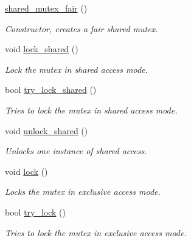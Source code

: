 \begin{DoxyCompactItemize}
\item 
\mbox{\label{classcpen333_1_1thread_1_1impl_1_1shared__mutex__fair_ae8ee9148ad58ad56c12b1cbf49cf9a4f}} 
\hyperlink{classcpen333_1_1thread_1_1impl_1_1shared__mutex__fair_ae8ee9148ad58ad56c12b1cbf49cf9a4f}{shared\+\_\+mutex\+\_\+fair} ()
\begin{DoxyCompactList}\small\item\em Constructor, creates a fair shared mutex. \end{DoxyCompactList}\item 
void \hyperlink{classcpen333_1_1thread_1_1impl_1_1shared__mutex__fair_a0d068ab1af09891a55ac4e066afaf6db}{lock\+\_\+shared} ()
\begin{DoxyCompactList}\small\item\em Lock the mutex in shared access mode. \end{DoxyCompactList}\item 
bool \hyperlink{classcpen333_1_1thread_1_1impl_1_1shared__mutex__fair_aaa17074a3c560ebd8c94a9cee09a1c3f}{try\+\_\+lock\+\_\+shared} ()
\begin{DoxyCompactList}\small\item\em Tries to lock the mutex in shared access mode. \end{DoxyCompactList}\item 
void \hyperlink{classcpen333_1_1thread_1_1impl_1_1shared__mutex__fair_a9a726de789646d73abf5fb03f7627a0b}{unlock\+\_\+shared} ()
\begin{DoxyCompactList}\small\item\em Unlocks one instance of shared access. \end{DoxyCompactList}\item 
void \hyperlink{classcpen333_1_1thread_1_1impl_1_1shared__mutex__fair_a2a75b9f3ae8336d2181cb098d2dcdf3e}{lock} ()
\begin{DoxyCompactList}\small\item\em Locks the mutex in exclusive access mode. \end{DoxyCompactList}\item 
bool \hyperlink{classcpen333_1_1thread_1_1impl_1_1shared__mutex__fair_aa36b18b2278011fdf6624cc61ee260a1}{try\+\_\+lock} ()
\begin{DoxyCompactList}\small\item\em Tries to lock the mutex in exclusive access mode. \end{DoxyCompactList}\item 

\end{DoxyCompactItemize}
